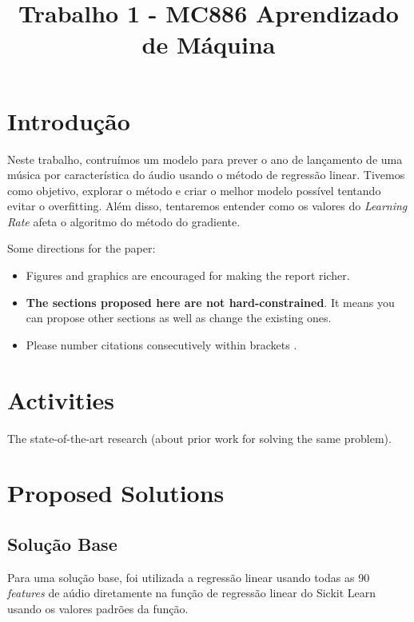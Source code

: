 \documentclass[conference]{IEEEtran}
\begin{document}
\title{Trabalho 1 - MC886 Aprendizado de Máquina}

\author{
\and
{}
}

\maketitle

\section{Introdução}

Neste trabalho, contruímos um modelo para prever o ano de lançamento de uma música por característica do áudio usando o método de regressão linear.
Tivemos como objetivo, explorar o método e criar o melhor modelo possível tentando evitar o overfitting.
Além disso, tentaremos entender como os valores do \textit{Learning Rate} afeta o algoritmo do método do gradiente.

Some directions for the paper:

\begin{itemize}
	\item Figures and graphics are encouraged for making the
	report richer.
	\item {\bf The sections proposed here are not hard-constrained}. It means you can propose other sections as well as change the existing ones.
	\item Please number citations consecutively within brackets \cite{b1}. 
\end{itemize}

\section{Activities}
 
The state-of-the-art research (about prior work for solving the same problem).

\section{Proposed Solutions}
\subsection{Solução Base}
Para uma solução base, foi utilizada a regressão linear usando todas as 90 \textit{features} de aúdio diretamente na função de regressão linear do Sickit Learn usando os valores padrões da função.
\end{document}

